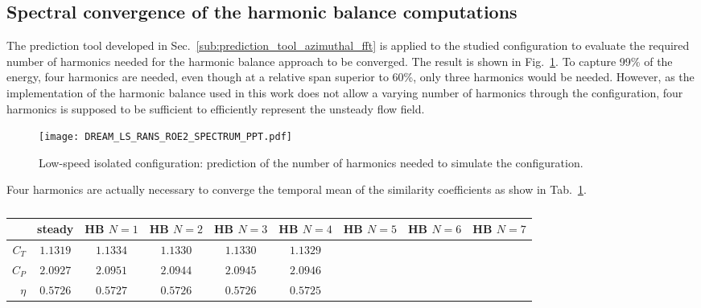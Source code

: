 
\subsection{Spectral convergence of the harmonic balance computations} 
\label{sub:dream_ls_hb_convergence}

The prediction tool developed in 
Sec.~\ref{sub:prediction_tool_azimuthal_fft} is applied
to the studied configuration to evaluate the
required number of harmonics needed for the
harmonic balance approach to be converged.
The result is shown in Fig.~\ref{fig:DREAM_LS_RANS_ROE2_SPECTRUM_PPT}.
To capture 99\% of the energy, four harmonics are needed, even though
at a relative span superior to 60\%, only three harmonics would be needed.
However, as the implementation of the harmonic balance used
in this work does not allow a varying number of harmonics through the
configuration, four harmonics is supposed to be sufficient to efficiently 
represent the unsteady flow field.
\begin{figure}
  \centering
  \texttt{[image: DREAM\_LS\_RANS\_ROE2\_SPECTRUM\_PPT.pdf]}
  \caption{Low-speed isolated configuration: prediction of the number
  of harmonics needed to simulate the configuration.}
  \label{fig:DREAM_LS_RANS_ROE2_SPECTRUM_PPT}
\end{figure}

Four harmonics are actually necessary to converge the temporal mean 
of the similarity coefficients as show 
in Tab.~\ref{tab:dream_ls_hb_conv_sim}.

\begin{table}
   \centering
  \begin{tabular}{rcccccccc}
    \toprule
    & steady & HB $N=1$ & HB $N=2$ & HB $N=3$ & HB $N=4$ & HB $N=5$ & HB $N=6$ & HB $N=7$\\
    \midrule
    $C_T$  & $1.1319$ & $1.1334$ & $1.1330$ & $1.1330$ & $1.1329$ \\
    $C_P$  & $2.0927$ & $2.0951$ & $2.0944$ & $2.0945$ & $2.0946$ \\
    $\eta$ & $0.5726$ & $0.5727$ & $0.5726$ & $0.5726$ & $0.5725$ \\
    \bottomrule
  \end{tabular}
  \caption{}
  \label{tab:dream_ls_hb_conv_sim}
\end{table}



